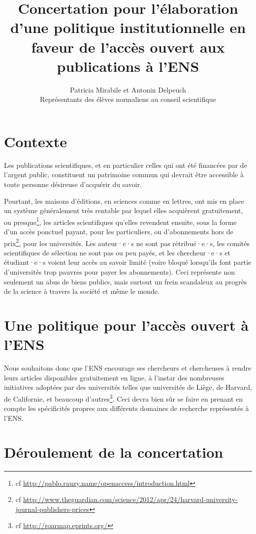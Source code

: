 \documentclass[a4paper]{article}
\title{Concertation pour l'élaboration d'une politique institutionnelle en faveur de l'accès ouvert aux publications à l'ENS}
\author{Patricia Mirabile et Antonin Delpeuch \\
Représentants des élèves normaliens au conseil scientifique}
\begin{document}
\maketitle

\section*{Contexte}

Les publications scientifiques, et en particulier celles qui ont été financées par de l'argent public, constituent un patrimoine commun qui devrait être accessible à toute personne désireuse d'acquérir du savoir.

Pourtant,  les maisons d'éditions, en sciences comme en lettres, ont mis en place un système généralement très rentable par lequel elles acquièrent gratuitement, ou presque\footnote{cf \url{http://pablo.rauzy.name/openaccess/introduction.html}}, les articles scientifiques qu'elles revendent ensuite, sous la forme d'un accès ponctuel payant, pour les particuliers, ou d'abonnements hors de prix\footnote{cf \url{http://www.theguardian.com/science/2012/apr/24/harvard-university-journal-publishers-prices}}, pour les universités. Les auteur·e·s ne sont pas rétribué·e·s, les comités scientifiques de sélection ne sont pas ou peu payés, et les chercheur·e·s et étudiant·e·s voient leur accès au savoir limité (voire bloqué lorsqu'ils font partie d'universités trop pauvres pour payer les abonnements). Ceci représente non seulement un abus de biens publics, mais surtout un frein scandaleux au progrès de la science à travers la société et même le monde. 

\section*{Une politique pour l'accès ouvert à l'ENS}


Nous souhaitons donc que l'ENS encourage ses chercheurs et chercheuses à rendre leurs
articles disponibles gratuitement en ligne, à l'instar des nombreuses initiatives adoptées par des universités telles que universités de Liège, de Harvard, de Californie, et
beaucoup d'autres\footnote{cf \url{http://roarmap.eprints.org/}}.
Ceci devra bien sûr se faire en prenant en compte les spécificités propres aux différents domaines de recherche représentés à l'ENS.


\section*{Déroulement de la concertation}
\end{document}
